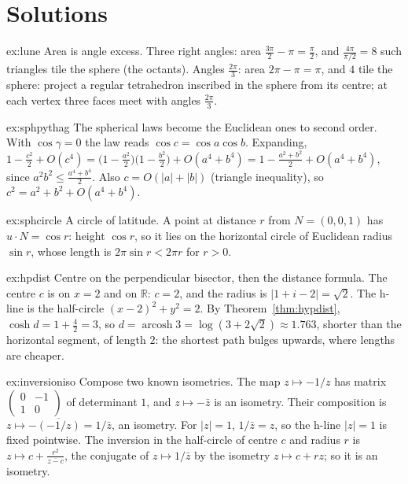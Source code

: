 \section{Solutions}

\begin{solution}{ex:lune}
\idea Area is angle excess.
\writeup Three right angles: area $\frac{3\pi}2-\pi=\frac\pi2$, and $\frac{4\pi}{\pi/2}=8$ such triangles tile the sphere (the octants). Angles $\frac{2\pi}3$:
area $2\pi-\pi=\pi$, and $4$ tile the sphere: project a regular tetrahedron inscribed in the sphere from its centre; at each vertex three faces meet with
angles $\frac{2\pi}3$.
\end{solution}

\begin{solution}{ex:sphpythag}
\idea The spherical laws become the Euclidean ones to second order.
\writeup With $\cos\gamma=0$ the law reads $\cos c=\cos a\cos b$. Expanding, $1-\frac{c^2}2+O(c^4)=\bigl(1-\frac{a^2}2\bigr)\bigl(1-\frac{b^2}2\bigr)+O(a^4+b^4)=
1-\frac{a^2+b^2}2+O(a^4+b^4)$, since $a^2b^2\le\frac{a^4+b^4}2$. Also $c=O(|a|+|b|)$ (triangle inequality), so $c^2=a^2+b^2+O(a^4+b^4)$.
\end{solution}

\begin{solution}{ex:sphcircle}
\idea A circle of latitude.
\writeup A point at distance $r$ from $N=(0,0,1)$ has $u\cdot N=\cos r$: height $\cos r$, so it lies on the horizontal circle of Euclidean radius $\sin r$,
whose length is $2\pi\sin r<2\pi r$ for $r>0$.
\end{solution}

\begin{solution}{ex:hpdist}
\idea Centre on the perpendicular bisector, then the distance formula.
\writeup The centre $c$ is on $x=2$ and on $\mathbb R$: $c=2$, and the radius is $|1+i-2|=\sqrt2$. The h-line is the half-circle $(x-2)^2+y^2=2$. By
Theorem~\ref{thm:hypdist}, $\cosh d=1+\frac{4}{2}=3$, so $d=\operatorname{arcosh}3=\log(3+2\sqrt2)\approx1.763$, shorter than the horizontal segment, of
length $2$: the shortest path bulges upwards, where lengths are cheaper.
\end{solution}

\begin{solution}{ex:inversioniso}
\idea Compose two known isometries.
\writeup The map $z\mapsto-1/z$ has matrix $\begin{pmatrix}0&-1\\1&0\end{pmatrix}$ of determinant $1$, and $z\mapsto-\bar z$ is an isometry. Their composition is
$z\mapsto-\overline{(-1/z)}=1/\bar z$, an isometry. For $|z|=1$, $1/\bar z=z$, so the h-line $|z|=1$ is fixed pointwise. The inversion in the half-circle of centre
$c$ and radius $r$ is $z\mapsto c+\frac{r^2}{\overline{z-c}}$, the conjugate of $z\mapsto1/\bar z$ by the isometry $z\mapsto c+rz$; so it is an isometry.
\end{solution}

